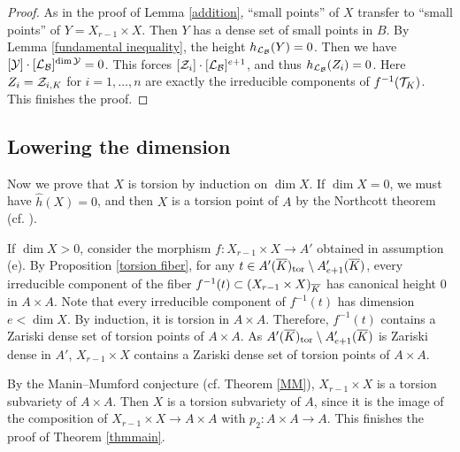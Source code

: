 \begin{proof}
As in the proof of Lemma \ref{addition},  ``small points'' of $X$ transfer to ``small points'' of $Y=X_{r-1}\times X$.
Then $Y$ has a dense set of small points in $B$.
By Lemma \ref{fundamental inequality}, the height
$h_{{\mathcal L}_{\mathcal B}}(Y)=0$.
Then we have $ [{\mathcal Y}] \cdot [{\mathcal L}_{\mathcal B}]^{\dim {\mathcal Y}}=0$.
This forces $[{\mathcal Z}_i]\cdot [{\mathcal L}_{\mathcal B}]^{e+1}$, and thus $h_{{\mathcal L}_{\mathcal B}}(Z_i)=0$.
Here $Z_i={\mathcal Z}_{i,K}$ for $i=1, \dots, n$ are exactly the irreducible components of $f^{-1}({\mathcal T}_K)$.
This finishes the proof.
\end{proof}




\subsection{Lowering the dimension}

Now we prove that $X$ is torsion by induction on $\dim X$.
If $\dim X=0$, we must have $\hat h(X)=0$, and then $X$ is a torsion point of $A$ by the Northcott theorem (cf. \cite[Theorem 9.15]{Conrad}).

If $\dim X>0$, consider the morphism $f:X_{r-1}\times X\to A'$ obtained in assumption (e).
By Proposition \ref{torsion fiber}, for any $t\in A'({\overline{K}})_{\mathrm{tor}}\setminus A'_{e+1}({\overline{K}})$, every irreducible component of the fiber $f^{-1}(t)\subset (X_{r-1}\times X)_{\overline{K}}$ has canonical height 0 in $A\times A$.
Note that every irreducible component of $f^{-1}(t)$ has dimension $e<\dim X$.
By induction, it is torsion in $A\times A$.
Therefore, $f^{-1}(t)$ contains a Zariski dense set of torsion points of $A\times A$.
As $A'({\overline{K}})_{\mathrm{tor}}\setminus A'_{e+1}({\overline{K}})$ is Zariski dense in $A'$,
$X_{r-1}\times X$ contains a Zariski dense set of torsion points of $A\times A$.

By the Manin--Mumford conjecture (cf. Theorem \ref{MM}),
$X_{r-1}\times X$ is a torsion subvariety of $A\times A$.
Then $X$ is a torsion subvariety of $A$, since it is the image of the composition of $X_{r-1}\times X\to A\times A$ with $p_2:A\times A\to A$.
This finishes the proof of Theorem \ref{thmmain}.








%
